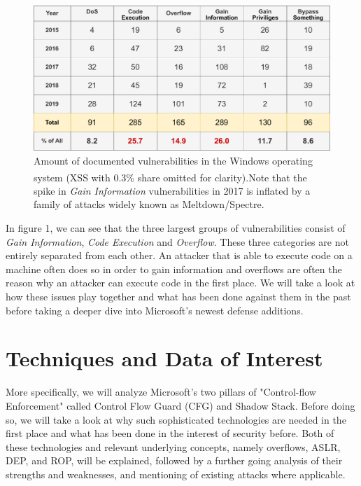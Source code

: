 \documentclass[10pt,twocolumn,a4paper]{article}
\begin{document}
\begin{figure}[h]
\centering
\includegraphics[keepaspectratio,width=\linewidth]{fig/cve}
\caption{Amount of documented vulnerabilities in the Windows operating system (XSS with 0.3\% share omitted for clarity)\textsuperscript{\cite{CVE}}.\newline Note that the spike in \emph{Gain Information} vulnerabilities in 2017 is inflated by a family of attacks widely known as Meltdown/Spectre.}
\end{figure}
\newpage
In figure 1, we can see that the three largest groups of vulnerabilities consist of \emph{Gain Information}, \emph{Code Execution} and \emph{Overflow}.
These three categories are not entirely separated from each other.
An attacker that is able to execute code on a machine often does so in order to gain information and overflows are often the reason why an attacker can execute code in the first place.
We will take a look at how these issues play together and what has been done against them in the past before taking a deeper dive into Microsoft's newest defense additions.

\section{Techniques and Data of Interest}
More specifically, we will analyze Microsoft's two pillars of "Control-flow Enforcement" called Control Flow Guard (CFG) and Shadow Stack.  Before doing so, we will take a look at why such sophisticated technologies are needed in the first place and what has been done in the interest of security before.
Both of these technologies and relevant underlying concepts, namely overflows, ASLR, DEP, and ROP, will be explained, followed by a further going analysis of their strengths and weaknesses, and mentioning of existing attacks where applicable.
\end{document}
